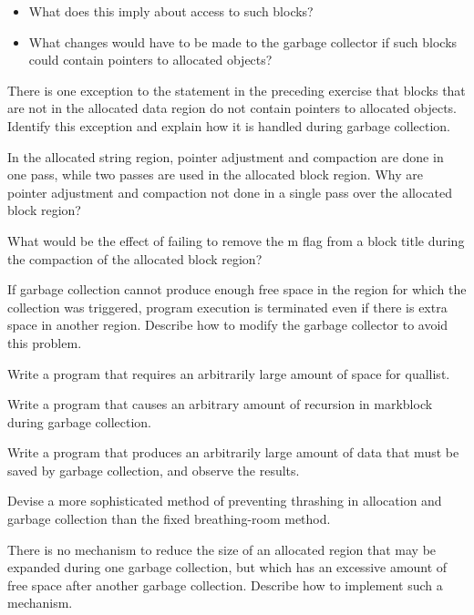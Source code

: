 \begin{itemize}
\item What does this imply about access to such blocks?

\item What changes would have to be made to the garbage collector if
such blocks could contain pointers to allocated objects?

\end{itemize}

 There is one exception to the statement in the
preceding exercise that blocks that are not in the allocated data
region do not contain pointers to allocated objects. Identify this
exception and explain how it is handled during garbage collection.

 In the allocated string region, pointer
adjustment and compaction are done in one pass, while two passes are
used in the allocated block region. Why are pointer adjustment and
compaction not done in a single pass over the allocated block region?

 What would be the effect of failing to remove
the m flag from a block title during the compaction of the allocated
block region?

 If garbage collection cannot produce enough free
space in the region for which the collection was triggered, program
execution is terminated even if there is extra space in another
region. Describe how to modify the garbage collector to avoid this
problem.

 Write a program that requires an arbitrarily
large amount of space for quallist.

 Write a program that causes an arbitrary amount
of recursion in markblock during garbage collection.

 Write a program that produces an arbitrarily
large amount of data that must be saved by garbage collection, and
observe the results.

 Devise a more sophisticated method of preventing
thrashing in allocation and garbage collection than the fixed
breathing-room method.

 There is no mechanism to reduce the size of an
allocated region that may be expanded during one garbage collection,
but which has an excessive amount of free space after another garbage
collection. Describe how to implement such a mechanism.

